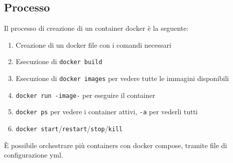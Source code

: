 \subsection{Processo}
Il processo di creazione di un container docker è la seguente:
\begin{enumerate}
    \item Creazione di un docker file con i comandi necessari
    \item Esecuzione di \texttt{docker build}
    \item Esecuzione di \texttt{docker images} per vedere tutte le immagini disponibili
    \item \texttt{docker run -image-} per eseguire il container
    \item \texttt{docker ps} per vedere i container attivi, \texttt{-a} per vederli tutti
    \item \texttt{docker start}/\texttt{restart}/\texttt{stop}/\texttt{kill}
\end{enumerate}
È possibile orchestrare più containers con docker compose, tramite file di configurazione
yml.